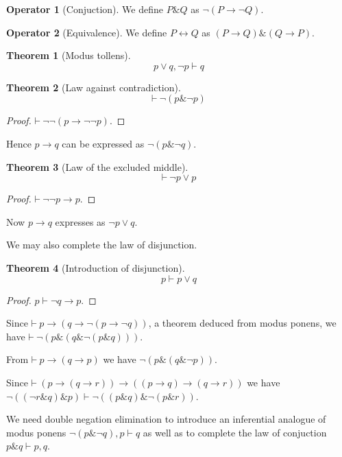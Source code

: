 \documentclass{amsbook}
\newcommand{\infers}{\mathrel\vdash}
\newcommand{\theorem}{\mathord\vdash\medspace}
\newcommand{\then}{\mathrel\rightarrow}
\newcommand{\conj}{\mathrel\&}
\newcommand{\eqv}{\mathrel\leftrightarrow}
\newcommand{\disj}{\mathrel\vee}
\theoremstyle{definition}
\newtheorem{op}{Operator}[section]
\newtheorem{thm}{Theorem}[section]
\begin{document}
\begin{op}[Conjuction]
    We define $P \conj Q$ as $\neg(P \then \neg Q)$.
\end{op}

\begin{op}[Equivalence]
    We define $P \eqv Q$ as $(P \then Q) \conj (Q \then P)$.
\end{op}

\begin{thm}[Modus tollens]
    $$p \disj q, \neg p \infers q$$
\end{thm}

\begin{thm}[Law against contradiction]
    $$\theorem \neg(p \conj \neg p)$$
    \begin{proof}
        $\theorem \neg\neg(p \then \neg\neg p)$.
    \end{proof}
\end{thm}

Hence $p \then q$ can be expressed as $\neg(p \conj \neg q)$.

\begin{thm}[Law of the excluded middle]
    $$\theorem \neg p \disj p$$
    \begin{proof}
        $\theorem \neg\neg p \then p$.
    \end{proof}
\end{thm}

Now $p \then q$ expresses as $\neg p \disj q$.

We may also complete the law of disjunction.

\begin{thm}[Introduction of disjunction]
    $$p \infers p \disj q$$
    \begin{proof}
        $p \infers \neg q \then p$.
    \end{proof}
\end{thm}

Since $\theorem p \then (q \then \neg(p \then \neg q))$, a theorem deduced from modus ponens, we have $\theorem \neg(p \conj (q \conj \neg(p \conj q)))$.

From $\theorem p \then (q \then p)$ we have $\neg(p \conj (q \conj \neg p)) $.

Since $\theorem (p \then (q \then r)) \then ((p \then q) \then (q \then r))$ we have $\neg((\neg r \conj q) \conj p) \infers \neg((p \conj q) \conj \neg(p \conj r))$.

We need double negation elimination to introduce an inferential analogue of modus ponens $\neg(p \conj \neg q), p \infers q$ as well as to complete the law of conjuction $p \conj q \infers p, q$.
\end{document}

